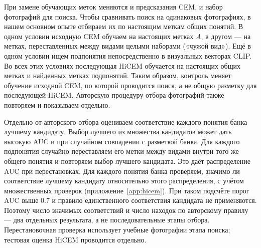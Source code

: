 \documentclass[10pt]{article}
\begin{document}
При замене обучающих меток меняются и предсказания CEM, и набор фотографий для поиска. Чтобы сравнивать поиск на одинаковых фотографиях, в нашем основном опыте отбираем их по настоящим меткам общих понятий. В одном условии исходную CEM обучаем на настоящих метках $A$, в другом --- на метках, переставленных между видами целыми наборами («чужой вид»). Ещё в одном условии ищем подпонятия непосредственно в визуальных векторах CLIP. Во всех этих условиях последующая HiCEM обучается на настоящих общих метках и найденных метках подпонятий. Таким образом, контроль меняет обучение исходной CEM, по которой проводится поиск, а не общую разметку для последующей HiCEM. Авторскую процедуру отбора фотографий также повторяем и показываем отдельно.

Отдельно от авторского отбора оцениваем соответствие каждого понятия банка лучшему кандидату. Выбор лучшего из множества кандидатов может дать высокую AUC и при случайном совпадении с разметкой банка. Для каждого подпонятия случайно переставляем его метки между видами внутри того же общего понятия и повторяем выбор лучшего кандидата. Это даёт распределение AUC при перестановках. Для каждого понятия банка проверяем, значимо ли соответствие лучшему кандидату относительно этого распределения, с учётом множественных проверок (приложение~\ref{app:hicem}). При таком подсчёте порог AUC выше 0.7 и правило единственного соответствия кандидата не применяются. Поэтому число значимых соответствий и число находок по авторскому правилу --- два отдельных результата, а не последовательные этапы отбора. Перестановочная проверка использует учебные фотографии этапа поиска; тестовая оценка HiCEM проводится отдельно.
\end{document}
